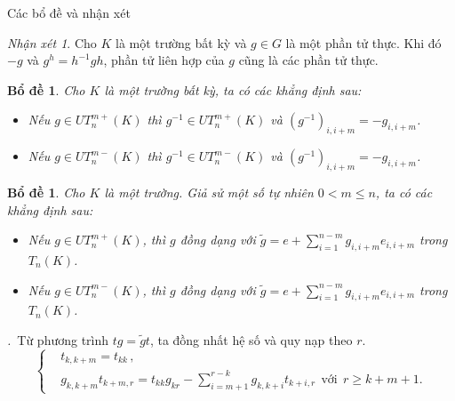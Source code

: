 \documentclass[11pt, aspectratio=169]{beamer}
\theoremstyle{plain}
\newtheorem{lem}[thm]{Bổ đề}
\theoremstyle{definition}
\theoremstyle{remark}
\newtheorem{rem}{Nhận xét}
\newcommand{\prfstart}{\textit{\proofname.}\ }
\newcommand{\prfend}{\hfill\qedsymbol}
\begin{document}
\begin{frame}{Các bổ đề và nhận xét}

\begin{rem} \label{rem:nhanxet1}
Cho \( K \) là một trường bất kỳ và \( g \in G \) là một phần tử thực. Khi đó \( -g \) và \( g^h = h^{-1} g h \), phần tử liên hợp của \( g \) cũng là các phần tử thực.
\end{rem}

\begin{lem}\label{lem:bode2.1}
Cho \( K \) là một trường bất kỳ, ta có các khẳng định sau:
\begin{itemize}
    \item Nếu \( g \in UT_{n}^{m+}(K) \) thì \( g^{-1} \in UT_{n}^{m+}(K) \) và \( (g^{-1})_{i, i + m} = -g_{i, i + m} \).
    \item Nếu \( g \in UT_{n}^{m-}(K) \) thì \( g^{-1} \in UT_{n}^{m-}(K) \) và \( (g^{-1})_{i, i + m} = -g_{i, i + m} \).
\end{itemize}
\end{lem}

\end{frame}

\begin{frame}

\begin{lem}\label{lem:bode2.2}
Cho $K$ là một trường. Giả sử một số tự nhiên $0<m\le n$, ta có các khẳng định sau:
\begin{itemize}
    \item Nếu $g\in UT_{n}^{m+}(K)$, thì $g$ đồng dạng với $\tilde{g} = e + \sum_{i=1}^{n-m} g_{i, i+m} e_{i, i+m}$ trong $T_n(K)$.
    \item Nếu $g\in UT_{n}^{m-}(K)$, thì $g$ đồng dạng với $\tilde{g} = e + \sum_{i=1}^{n-m} g_{i, i+m} e_{i, i+m}$ trong $T_n(K)$.
\end{itemize}
\end{lem}

\prfstart Từ phương trình \( tg = \tilde{g}t \), ta đồng nhất hệ số và quy nạp theo \( r \). 
\[
\left\{ \begin{aligned}
        &t_{k, k + m} = t_{kk}\,, \\
        &g_{k, k + m} t_{k + m, r} = t_{kk} g_{kr} - \sum_{i = m + 1}^{r - k} g_{k, k + i} t_{k + i, r} ~~\text{với}~~ r \ge k + m + 1.
\end{aligned} \right.
\]
\prfend

\end{frame}
\end{document}
